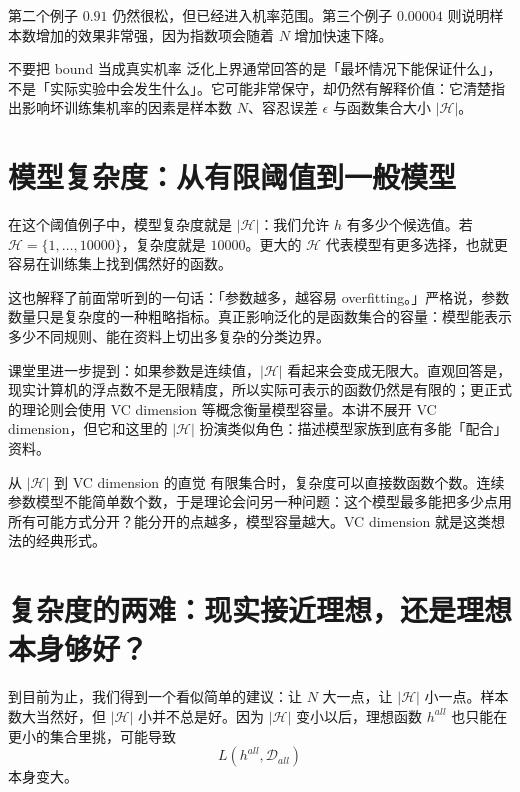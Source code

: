 \documentclass[a4paper]{article}
\newcommand{\Dall}{\mathcal{D}_{all}}
\newcommand{\HH}{\mathcal{H}}
\begin{document}
第二个例子 $0.91$ 仍然很松，但已经进入机率范围。第三个例子 $0.00004$ 则说明样本数增加的效果非常强，因为指数项会随着 $N$ 增加快速下降。

\begin{warningbox}{不要把 bound 当成真实机率}
    泛化上界通常回答的是「最坏情况下能保证什么」，不是「实际实验中会发生什么」。它可能非常保守，却仍然有解释价值：它清楚指出影响坏训练集机率的因素是样本数 $N$、容忍误差 $\epsilon$ 与函数集合大小 $|\HH|$。
\end{warningbox}

\section{模型复杂度：从有限阈值到一般模型}

在这个阈值例子中，模型复杂度就是 $|\HH|$：我们允许 $h$ 有多少个候选值。若 $\HH=\{1,\ldots,10000\}$，复杂度就是 $10000$。更大的 $\HH$ 代表模型有更多选择，也就更容易在训练集上找到偶然好的函数。

这也解释了前面常听到的一句话：「参数越多，越容易 overfitting。」严格说，参数数量只是复杂度的一种粗略指标。真正影响泛化的是函数集合的容量：模型能表示多少不同规则、能在资料上切出多复杂的分类边界。

课堂里进一步提到：如果参数是连续值，$|\HH|$ 看起来会变成无限大。直观回答是，现实计算机的浮点数不是无限精度，所以实际可表示的函数仍然是有限的；更正式的理论则会使用 VC dimension 等概念衡量模型容量。本讲不展开 VC dimension，但它和这里的 $|\HH|$ 扮演类似角色：描述模型家族到底有多能「配合」资料。

\begin{knowledgebox}{从 $|\HH|$ 到 VC dimension 的直觉}
    有限集合时，复杂度可以直接数函数个数。连续参数模型不能简单数个数，于是理论会问另一种问题：这个模型最多能把多少点用所有可能方式分开？能分开的点越多，模型容量越大。VC dimension 就是这类想法的经典形式。
\end{knowledgebox}

\section{复杂度的两难：现实接近理想，还是理想本身够好？}

到目前为止，我们得到一个看似简单的建议：让 $N$ 大一点，让 $|\HH|$ 小一点。样本数大当然好，但 $|\HH|$ 小并不总是好。因为 $|\HH|$ 变小以后，理想函数 $h^{all}$ 也只能在更小的集合里挑，可能导致
\[
    L(h^{all},\Dall)
\]
本身变大。
\end{document}
